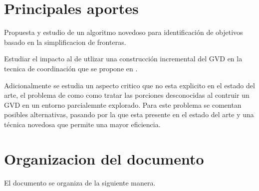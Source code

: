 
\section{Principales aportes}
Propuesta y estudio de un algoritmo novedoso para identificación de objetivos
basado en la simplificacion de fronteras.

Estudiar el impacto al de utlizar una construcción incremental del GVD en la
tecnica de coordinación que se propone en \cite{wurm2008coordinated}. 

Adicionalmente se estudia un aspecto critico que no esta explicito en el estado
del arte, el problema de como como tratar las porciones desconocidas al
contruir un GVD en un entorno parcialemnte explorado. Para este problema se
comentan posibles alternativas, pasando por la que esta presente en el estado
del arte y una técnica novedosa que permite una mayor eficiencia.


\section{Organizacion del documento}
El documento se organiza de la siguiente manera.



